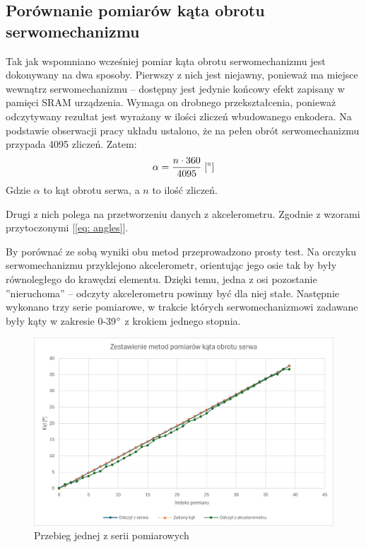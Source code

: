 \subsection{Porównanie pomiarów kąta obrotu serwomechanizmu}
Tak jak wspomniano wcześniej pomiar kąta obrotu serwomechanizmu jest dokonywany na dwa sposoby. Pierwszy z nich jest niejawny, ponieważ ma miejsce wewnątrz serwomechanizmu -- dostępny jest jedynie końcowy efekt zapisany w pamięci SRAM urządzenia. Wymaga on drobnego przekształcenia, ponieważ odczytywany rezultat jest wyrażany w ilości zliczeń wbudowanego enkodera. Na podstawie obserwacji pracy układu ustalono, że na pełen obrót serwomechanizmu przypada 4095 zliczeń. Zatem:
    \begin{equation}
        \alpha = \dfrac{n \cdot 360}{4095} \; [\degree]
    \end{equation}
Gdzie $\alpha$ to kąt obrotu serwa, a $n$ to ilość zliczeń.

Drugi z nich polega na przetworzeniu danych z akcelerometru. Zgodnie z wzorami przytoczonymi [\ref{eq: angles}]. 

By porównać ze sobą wyniki obu metod przeprowadzono prosty test. Na orczyku serwomechanizmu przyklejono akcelerometr, orientując jego osie tak by były równoległego do krawędzi elementu. Dzięki temu, jedna z osi pozostanie ''nieruchoma'' -- odczyty akcelerometru powinny być dla niej stałe. Następnie wykonano trzy serie pomiarowe, w trakcie których serwomechanizmowi zadawane były kąty w zakresie 0-39$\degree$ z krokiem jednego stopnia. 

\begin{figure}[ht!]
    \centering
    \includegraphics[width=\linewidth]{rysunki/acc/graph.png}
    \caption{Przebieg jednej z serii pomiarowych}
    \label{fig: graph_meas}
\end{figure} 


